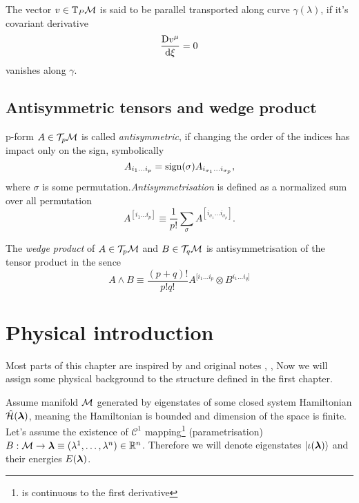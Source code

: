 The vector $v\in \mathbb{T}_P\mathcal{M}$ is said to be parallel transported along curve $\gamma(\lambda)$, if it's covariant derivative
\begin{equation}
    \frac{\mathrm{D} v^\mu}{\mathrm{d} \xi}=0
\end{equation}
vanishes along $\gamma$.

\section{Antisymmetric tensors and wedge product}
p-form $A\in \mathcal{T}_p \mathcal{M}$ is called \emph{antisymmetric}, if changing the order of the indices has impact only on the sign, symbolically
$$A_{i_1\dots i_p} = \operatorname{\textrm{sign}}(\sigma)A_{i_{\sigma_1}\dots i_{\sigma_p}},$$
where $\sigma$ is some permutation.\emph{Antisymmetrisation} is defined as a normalized sum over all permutation
\begin{equation}
    A^{[i_1\dots i_p]}\equiv \frac{1}{p!}\sum_\sigma A^{[i_{\sigma_1}\dots i_{\sigma_p}]}. 
\end{equation}

The \emph{wedge product} of $A\in \mathcal{T}_p \mathcal{M}$ and $B\in \mathcal{T}_q \mathcal{M}$ is antisymmetrisation of the tensor product in the sence
\begin{equation}
    A\wedge B\equiv \frac{(p+q)!}{p!q!} A^{[i_1\dots i_p}\otimes B^{i_1\dots i_q]}
\end{equation}



\chapter{Physical introduction}
Most parts of this chapter are inspired by \citep{kolodrubez} and original notes \citep{berry1984}, \citep{berry1989}, \citep{berry2009}
Now we will assign some physical background to the structure defined in the first chapter.

Assume manifold $\mathcal{M}$ generated by eigenstates of some closed system Hamiltonian $\hat{\mathcal{H}}(\bm\lambda)$, meaning the Hamiltonian is bounded and dimension of the space is finite. Let's assume the existence of $\mathcal{C}^1$ mapping\footnote{is continuous to the first derivative} (parametrisation) $B: \mathcal{M}\rightarrow \bm{\bm\lambda}\equiv (\lambda^1,\dots,\lambda^n)\in\mathbb{R}^n$. Therefore we will denote eigenstates $\ket{\iota(\bm{\bm\lambda})}$ and their energies $E(\bm{\bm\lambda})$.









